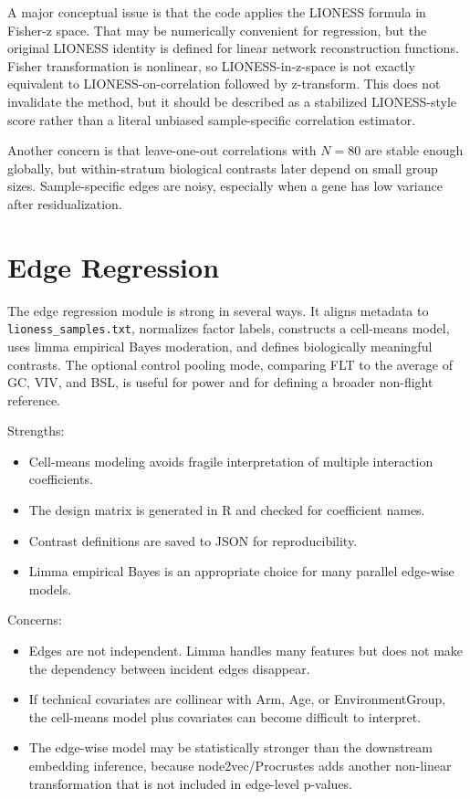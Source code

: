 \documentclass[11pt]{article}
\begin{document}
A major conceptual issue is that the code applies the LIONESS formula in Fisher-z space.  That may be numerically convenient for regression, but the original LIONESS identity is defined for linear network reconstruction functions.  Fisher transformation is nonlinear, so LIONESS-in-z-space is not exactly equivalent to LIONESS-on-correlation followed by z-transform.  This does not invalidate the method, but it should be described as a stabilized LIONESS-style score rather than a literal unbiased sample-specific correlation estimator.

Another concern is that leave-one-out correlations with $N=80$ are stable enough globally, but within-stratum biological contrasts later depend on small group sizes.  Sample-specific edges are noisy, especially when a gene has low variance after residualization.

\section{Edge Regression}

The edge regression module is strong in several ways.  It aligns metadata to \texttt{lioness\_samples.txt}, normalizes factor labels, constructs a cell-means model, uses limma empirical Bayes moderation, and defines biologically meaningful contrasts.  The optional control pooling mode, comparing FLT to the average of GC, VIV, and BSL, is useful for power and for defining a broader non-flight reference.

Strengths:
\begin{itemize}[leftmargin=1.5em]
    \item Cell-means modeling avoids fragile interpretation of multiple interaction coefficients.
    \item The design matrix is generated in R and checked for coefficient names.
    \item Contrast definitions are saved to JSON for reproducibility.
    \item Limma empirical Bayes is an appropriate choice for many parallel edge-wise models.
\end{itemize}

Concerns:
\begin{itemize}[leftmargin=1.5em]
    \item Edges are not independent.  Limma handles many features but does not make the dependency between incident edges disappear.
    \item If technical covariates are collinear with Arm, Age, or EnvironmentGroup, the cell-means model plus covariates can become difficult to interpret.
    \item The edge-wise model may be statistically stronger than the downstream embedding inference, because node2vec/Procrustes adds another non-linear transformation that is not included in edge-level p-values.
\end{itemize}
\end{document}
